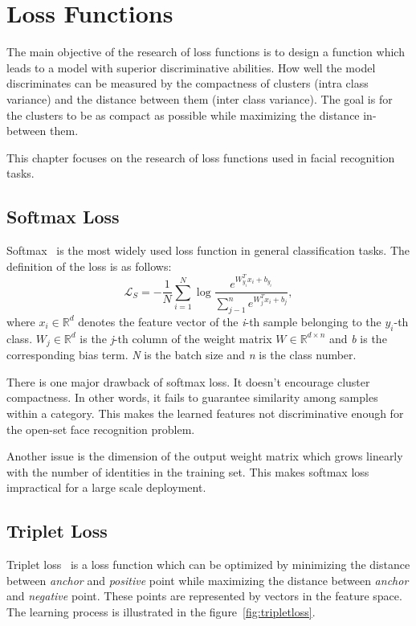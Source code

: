 \chapter{Loss Functions}\label{ch:loss-functions}
The main objective of the research of loss functions is to design a function which leads to a model with superior
discriminative abilities.
How well the model discriminates can be measured by the compactness of clusters (intra class variance) and the
distance between them (inter class variance).
The goal is for the clusters to be as compact as possible while maximizing the distance in-between them.

This chapter focuses on the research of loss functions used in facial recognition tasks.

\section{Softmax Loss}\label{sec:softmax-loss}
Softmax~\cite{ArcFace} is the most widely used loss function in general classification tasks.
The definition of the loss is as follows:
\begin{equation}
    \label{eq:softmax}
    \mathcal{L}_S = -\frac{1}{N} \sum_{i=1}^{N} \log \frac{e^{W^T_{y_i} x_{i} + b_{y_i}}}
    {\sum_{j-1}^{n} e^{W^T_{j} x_{i} + b_{j}}},
\end{equation}
where $x_i \in \mathbb{R}^{d}$ denotes the feature vector of the \textit{i}-th sample belonging to the $y_i$-th class.
$W_j \in \mathbb{R}^{d}$ is the \textit{j}-th column of the weight matrix $W \in \mathbb{R}^{d \times n}$ and \textit{b}
is the corresponding bias term.
\textit{N} is the batch size and \textit{n} is the class number.

There is one major drawback of softmax loss.
It doesn't encourage cluster compactness.
In other words, it fails to guarantee similarity among samples within a category.
This makes the learned features not discriminative enough for the open-set face recognition
problem.

Another issue is the dimension of the output weight matrix which grows linearly with the number of identities in the
training set.
This makes softmax loss impractical for a large scale deployment.

\section{Triplet Loss}\label{sec:triplet-loss}
Triplet loss~\cite{TripletLoss} is a loss function which can be optimized by minimizing the distance between
\textit{anchor} and \textit{positive} point while maximizing the distance between \textit{anchor} and \textit{negative}
point.
These points are represented by vectors in the feature space.
The learning process is illustrated in the figure~\ref{fig:tripletloss}.

